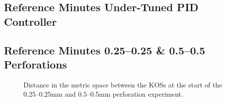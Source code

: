 \subsection{Reference Minutes Under-Tuned PID Controller}
\begin{table}[bh]
    \centering
    \caption{Numerical values of the reference minute metrics for the \emph{under-tuned} PID experiment.}
    \vspace*{-1em}
    \begin{subtable}{\linewidth}
        \centering\vspace*{1em}
        \caption{Baseline controller}
        \label{tab:ref-soft-baseline}
        
    \end{subtable}
    \begin{subtable}[t]{\linewidth}
        \centering
        \vspace*{1em}
        \caption{(Disabled) target adapter}
        \label{tab:ref-soft-adapter}
        
    \end{subtable}
\end{table}

\FloatBarrier
\pagebreak

\subsection{Reference Minutes 0.25--0.25 \& 0.5--0.5 Perforations}
\begin{figure}[ht]
    \centering
    
    \vspace*{-1em}
    \caption{Distance in the metric space between the KOSs at the start of the 0.25--0.25\si{\mm} and 0.5--0.5\si{\mm} perforation experiment.}
    \label{fig:ref-25-50}
\end{figure}

\begin{table}[ht]
    \centering
    \caption{Numerical values of the reference minute metrics for the 0.25--0.25\si{\mm} and 0.5--0.5\si{\mm} perforation experiment.}
    \label{tab:ref-25-50}
    \begin{subtable}{.45\linewidth}
        \centering\vspace*{1em}
        \caption{Baseline controller}
        
    \end{subtable}
    \hfill
    \begin{subtable}[t]{.45\linewidth}
        \centering
        \vspace*{1em}
        \caption{(Disabled) target adapter}
        
    \end{subtable}
\end{table}

